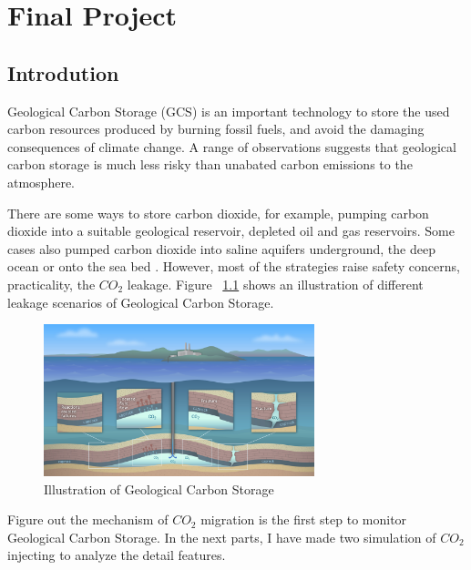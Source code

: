 \chapter{Final Project}


\section{Introdution}
Geological Carbon Storage (GCS) is an important technology to store the used carbon resources produced by burning fossil fuels,
and avoid the damaging consequences of climate change. 
A range of observations suggests that geological carbon storage is much less risky than unabated carbon emissions to the atmosphere.
\citep{bickle2009geological}


There are some ways to store carbon dioxide, for example, pumping carbon dioxide into a suitable geological reservoir, depleted oil and gas reservoirs.
Some cases also pumped carbon dioxide into saline aquifers underground, the deep ocean or onto the sea bed \citep{KOLSTER201877}.
However, most of the strategies raise safety concerns, practicality, the $CO_2$ leakage.
Figure ~\ref{fig:gcs}  \citep{gatech} shows an illustration of different leakage scenarios of Geological Carbon Storage.

\begin{figure}[H]
    \centering
    \includegraphics[width=0.7\textwidth]{figures/project/gcs.png}
    \caption{Illustration of Geological Carbon Storage}
    \label{fig:gcs}
\end{figure}

Figure out the mechanism of $CO_2$ migration is the first step to monitor Geological Carbon Storage.
In the next parts, I have made two simulation of $CO_2$ injecting to analyze the detail features.



